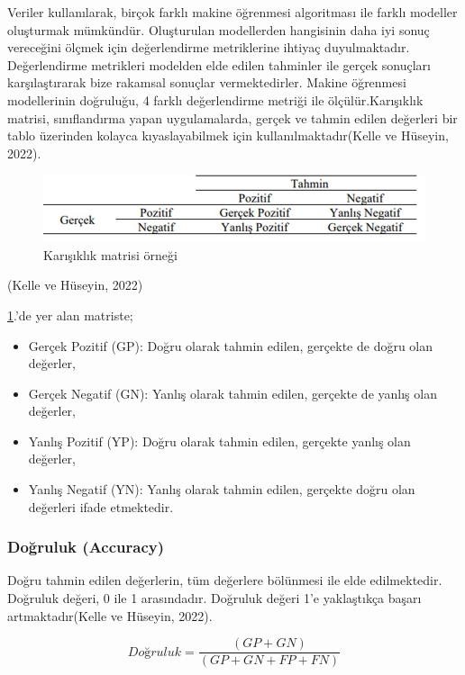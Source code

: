 \documentclass[12pt,twoside]{deuthesis}
\providecommand{\tightlist}{%
  \setlength{\itemsep}{0pt}\setlength{\parskip}{0pt}}
\begin{document}
Veriler kullanılarak, birçok farklı makine öğrenmesi algoritması ile farklı modeller oluşturmak mümkündür. Oluşturulan modellerden hangisinin daha iyi sonuç vereceğini ölçmek için değerlendirme metriklerine ihtiyaç duyulmaktadır. Değerlendirme metrikleri modelden elde edilen tahminler ile gerçek sonuçları karşılaştırarak bize rakamsal sonuçlar vermektedirler. Makine öğrenmesi modellerinin doğruluğu, 4 farklı değerlendirme metriği ile ölçülür.Karışıklık matrisi, sınıflandırma yapan uygulamalarda, gerçek ve tahmin edilen değerleri bir tablo üzerinden kolayca kıyaslayabilmek için kullanılmaktadır(Kelle ve Hüseyin, 2022).
\begin{figure}

{\centering \includegraphics[width=0.7\linewidth,height=0.2\textheight]{figure/conf_mat} 

}

\caption{Karışıklık matrisi örneği}\label{fig:confmat}
\end{figure}
(Kelle ve Hüseyin, 2022)

\ref{fig:confmat}.'de yer alan matriste;
\begin{itemize}
\tightlist
\item
  Gerçek Pozitif (GP): Doğru olarak tahmin edilen, gerçekte de doğru olan değerler,
\item
  Gerçek Negatif (GN): Yanlış olarak tahmin edilen, gerçekte de yanlış olan değerler,
\item
  Yanlış Pozitif (YP): Doğru olarak tahmin edilen, gerçekte yanlış olan değerler,
\item
  Yanlış Negatif (YN): Yanlış olarak tahmin edilen, gerçekte doğru olan değerleri ifade etmektedir.
\end{itemize}
\hypertarget{doux11fruluk-accuracy}{%
\subsubsection{Doğruluk (Accuracy)}\label{doux11fruluk-accuracy}}

Doğru tahmin edilen değerlerin, tüm değerlere bölünmesi ile elde edilmektedir. Doğruluk değeri, 0 ile 1 arasındadır. Doğruluk değeri 1'e yaklaştıkça başarı artmaktadır(Kelle ve Hüseyin, 2022).

\[Doğruluk = \frac{(GP + GN)}{(GP + GN + FP + FN)}\]
\end{document}
